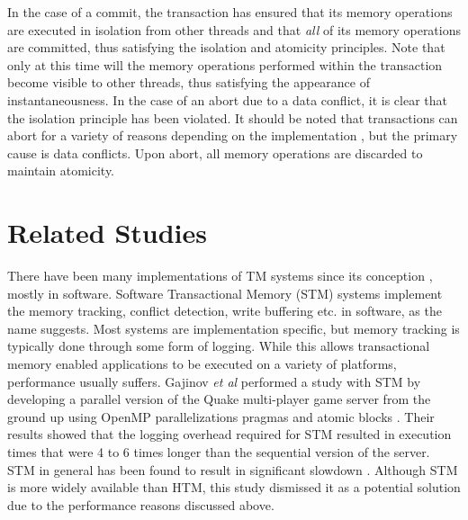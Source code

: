 \documentclass[11pt]{book}
\begin{document}
In the case of a commit, the transaction has ensured that its memory operations are
executed in isolation from other threads and that \emph{all} of its memory operations are
committed, thus satisfying the isolation and atomicity principles.  Note that only at this
time will the memory operations performed within the transaction become visible to other
threads, thus satisfying the appearance of instantaneousness.  In the case of an abort due
to a data conflict, it is clear that the isolation principle has been violated.  It should
be noted that transactions can abort for a variety of reasons depending on the
implementation \cite{intel_opt_man,chung_amd}, but the primary cause is data conflicts.
Upon abort, all memory operations are discarded to maintain atomicity.

\section{Related Studies}


There have been many implementations of TM systems since its conception
\cite{yoo_tsx,chitters_tsx,rock_dice,chung_amd,blue_wang,quake_stm,stm_cascaval},
mostly in software.  Software Transactional Memory (STM) systems implement the
memory tracking, conflict detection, write buffering etc. in software, as the
name suggests.  Most systems are implementation specific, but memory tracking is
typically done through some form of logging.  While this allows transactional
memory enabled applications to be executed on a variety of platforms,
performance usually suffers.  Gajinov \emph{et al} performed a study with STM by
developing a parallel version of the Quake multi-player game server from the
ground up using OpenMP parallelizations pragmas and atomic blocks
\cite{quake_stm}.  Their results showed that the logging overhead required for
STM resulted in execution times that were 4 to 6 times longer than the
sequential version of the server.  STM in general has been found to result in
significant slowdown \cite{stm_cascaval}.  Although STM is more widely available
than HTM, this study dismissed it as a potential solution due to the performance
reasons discussed above.
\end{document}
